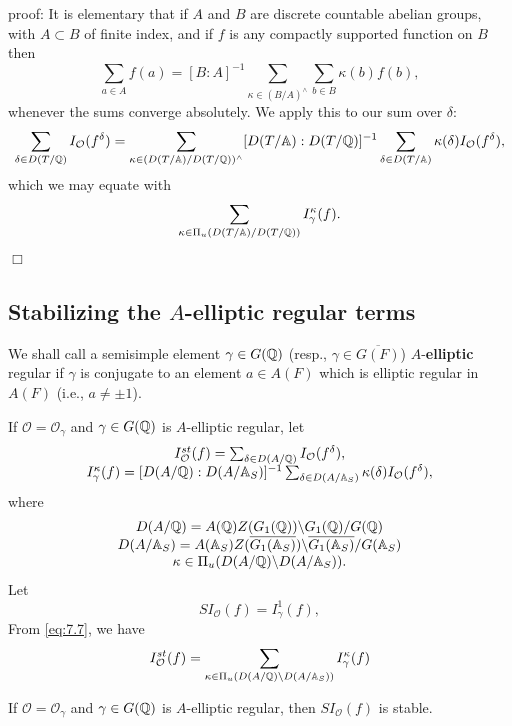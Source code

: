 proof: It is elementary that if $A$ and $B$ are
discrete countable abelian groups, with $A\subset B$ of finite
index, and if $f$ is any compactly supported function on $B$ then 
\begin{equation}\label{eq:7.7}
\sum_{a\in A}f(a)=[B:A]^{-1}\sum_{\kappa \in (B/A)^{\wedge }}\sum_{b\in
B}\kappa (b)f(b),
\end{equation}
whenever the sums converge absolutely. We apply this to our sum over $\delta 
$: 
\[
\sum_{\delta \in D(T/\mathbb{Q} )}
I_{\mathcal{O}}(f^\delta)
=
\sum_{\kappa \in (D(T/\mathbb{A} )/D(T/\mathbb{Q} ))^{\wedge}}
[D(T/\mathbb{A} ):D(T/\mathbb{Q} )]^{-1}
\sum_{\delta \in D(T/\mathbb{A} )}
\kappa (\delta )I_{\mathcal{O}}(f^\delta),
\]
which we may equate with
\begin{equation}\label{eq:7.8}
\sum_{\kappa \in \Pi_u(D(T/\mathbb{A} )/D(T/\mathbb{Q} ))}
I^\kappa_\gamma (f).
\end{equation}
$\Box$

\subsection{Stabilizing the $A$-elliptic regular terms}

We shall call a semisimple element
$\gamma \in G(\mathbb{Q} )$
(resp., $\gamma \in \overline{G(F)}$) $A$-\textbf{elliptic} regular if
$\gamma $ is conjugate to an element $a\in A(F)$
which is elliptic regular in $A(F)$ (i.e., $a\not= \pm 1$).

If $\mathcal{O}=\mathcal{O}_\gamma $ and
$\gamma \in G(\mathbb{Q} )$ is $A$-elliptic regular, let 
\begin{equation}\label{eq:7.9}
\begin{array}{c}
I^{st}_{\mathcal{O}}(f)=
\sum_{\delta\in D(A/\mathbb{Q} )}
I_{\mathcal{O}} (f^\delta),\\
I^\kappa_\gamma(f)
=[D(A/\mathbb{Q} ):D(A/\mathbb{A} _S)]^{-1}
\sum_{\delta\in D(A/\mathbb{A} _S)}
\kappa(\delta) I_{\mathcal{O}} (f^\delta),
\end{array}
\end{equation}
where
\[
\begin{array}{c}
D(A/\mathbb{Q} )
=A(\mathbb{Q} )Z(G_1(\mathbb{Q} ))\backslash G_1(\mathbb{Q} )/G(\mathbb{Q} ) \\
D(A/\mathbb{A} _S)
=A(\mathbb{A} _S)Z(\overline{G_1(\mathbb{A} _S)})
\backslash \overline{G_1(\mathbb{A} _S)}/G(\mathbb{A} _S) \\
\kappa\in \Pi_u(D(A/\mathbb{Q} )\backslash D(A/\mathbb{A} _S)).
\end{array}
\]
Let
\[
SI_{\mathcal{O}}(f)=I^1_{\gamma} (f),
\]
From \eqref{eq:7.7}, we have
\begin{equation}\label{eq:7.10}
I^{st}_{\mathcal{O}}(f)=
\sum_{\kappa\in \Pi_u(D(A/\mathbb{Q} )\backslash D(A/\mathbb{A} _S))}
I^\kappa_\gamma(f)
\end{equation}
\begin{lemma}\label{lem:7.6}
If $\mathcal{O}=\mathcal{O}_\gamma $ and
$\gamma \in G(\mathbb{Q} )$ is $A$-elliptic regular, then
$SI_{\mathcal{O}}(f)$ is stable.
\end{lemma}

